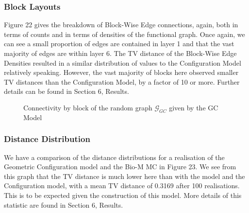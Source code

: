 \subsubsection{Block Layouts}
Figure 22 gives the breakdown of Block-Wise Edge connections, again, both in terms of counts and in terms of densities of the functional graph. Once again, we can see a small proportion of edges are contained in layer 1 and that the vast majority of edges are within layer 6. The TV distance of the Block-Wise Edge Densities resulted in a similar distribution of values to the Configuration Model relatively speaking. However, the vast majority of blocks here observed smaller TV distances than the Configuration Model, by a factor of 10 or more. Further details can be found in Section 6, Results.

\begin{figure}[H]%
    \centering
    \captionsetup{justification=centering}
    \qquad
    \caption{Connectivity by block of the random graph $\mathcal{G}_{GC}$ given by the GC Model}%
    \label{fig:example}%
\end{figure}
\subsubsection{Distance Distribution}
We have a comparison of the distance distributions for a realisation of the Geometric Configuration model and the Bio-M MC in Figure 23. We see from this graph that the TV distance is much lower here than with the \ER model and the Configuration model, with a mean TV distance of 0.3169 after 100 realisations. This is to be expected given the construction of this model. More details of this statistic are found in Section 6, Results.


